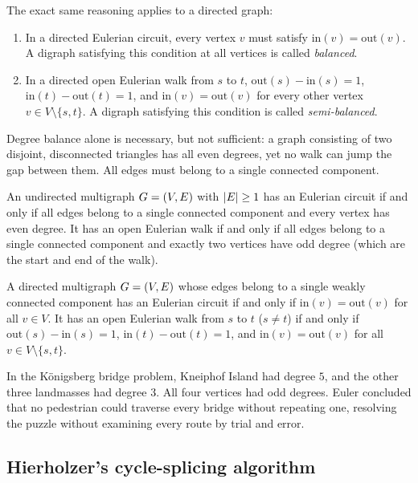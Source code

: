 The exact same reasoning applies to a directed graph:
\begin{enumerate}
  \item In a directed Eulerian circuit, every vertex $v$ must satisfy $\mathrm{in}(v) = \mathrm{out}(v)$. A digraph satisfying this condition at all vertices is called \emph{balanced}.
  \item In a directed open Eulerian walk from $s$ to $t$, $\mathrm{out}(s) - \mathrm{in}(s) = 1$, $\mathrm{in}(t) - \mathrm{out}(t) = 1$, and $\mathrm{in}(v) = \mathrm{out}(v)$ for every other vertex $v \in V \setminus \{s,t\}$. A digraph satisfying this condition is called \emph{semi-balanced}.
\end{enumerate}

Degree balance alone is necessary, but not sufficient: a graph consisting of two disjoint, disconnected triangles has all even degrees, yet no walk can jump the gap between them. All edges must belong to a single connected component.

\begin{theorem}
\label{ch05:thm-euler}
An undirected multigraph $G=(V,E)$ with $\lvert E\rvert\ge 1$ has an Eulerian circuit if and only if all edges belong to a single connected component and every vertex has even degree. It has an open Eulerian walk if and only if all edges belong to a single connected component and exactly two vertices have odd degree (which are the start and end of the walk).

A directed multigraph $G=(V,E)$ whose edges belong to a single weakly connected component has an Eulerian circuit if and only if $\mathrm{in}(v) = \mathrm{out}(v)$ for all $v \in V$. It has an open Eulerian walk from $s$ to $t$ ($s \ne t$) if and only if $\mathrm{out}(s) - \mathrm{in}(s) = 1$, $\mathrm{in}(t) - \mathrm{out}(t) = 1$, and $\mathrm{in}(v) = \mathrm{out}(v)$ for all $v \in V \setminus \{s,t\}$.
\end{theorem}

In the K{\"o}nigsberg bridge problem, Kneiphof Island had degree $5$, and the other three landmasses had degree $3$. All four vertices had odd degrees. Euler concluded that no pedestrian could traverse every bridge without repeating one, resolving the puzzle without examining every route by trial and error.

\subsection{Hierholzer's cycle-splicing algorithm}

